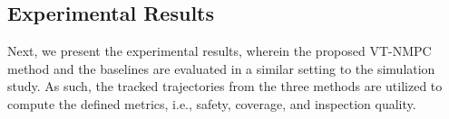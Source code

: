 
\subsection{Experimental Results}

Next, we present the experimental results, wherein the proposed VT-NMPC method and the baselines are evaluated in a similar setting to the simulation study. As such, the tracked trajectories from the three methods are utilized to compute the defined metrics, i.e., safety, coverage, and inspection quality. 


